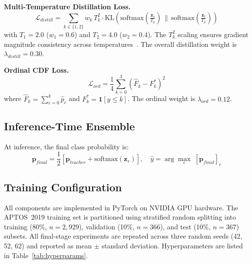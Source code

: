 \documentclass[10pt, twocolumn]{article}
\begin{document}
\textbf{Multi-Temperature Distillation Loss.}
\begin{equation}
  \mathcal{L}_{distill} = \sum_{k \in \{1,2\}} w_k\, T_k^2 \cdot
  \text{KL}\!\left(\text{softmax}\!\left(\tfrac{\mathbf{z}_s}{T_k}\right) \,\Big\|\,
  \text{softmax}\!\left(\tfrac{\mathbf{z}_t}{T_k}\right)\right)
\end{equation}
with $T_1{=}2.0$ ($w_1{=}0.6$) and $T_2{=}4.0$ ($w_2{=}0.4$). The $T_k^2$
scaling ensures gradient magnitude consistency across temperatures~\cite{hinton2015}.
The overall distillation weight is $\lambda_{distill} = 0.30$.

\textbf{Ordinal CDF Loss.}
\begin{equation}
  \mathcal{L}_{ord} = \frac{1}{4}\sum_{k=0}^{3} \left(\hat{F}_k - F_k^*\right)^2
\end{equation}
where $\hat{F}_k = \sum_{c=0}^{k} \hat{p}_c$ and $F_k^* = \mathbf{1}[y \leq k]$.
The ordinal weight is $\lambda_{ord} = 0.12$.

\subsection{Inference-Time Ensemble}

At inference, the final class probability is:
\begin{equation}
  \mathbf{p}_{final} = \frac{1}{2}\!\left[\mathbf{p}_{teacher} +
  \text{softmax}(\mathbf{z}_s)\right], \quad
  \hat{y} = \arg\max_c\; [\mathbf{p}_{final}]_c
\end{equation}

\subsection{Training Configuration}

All components are implemented in PyTorch on NVIDIA GPU hardware. The APTOS~2019
training set is partitioned using stratified random splitting into training (80\%,
$n{=}2{,}929$), validation (10\%, $n{=}366$), and test (10\%, $n{=}367$) subsets.
All final-stage experiments are repeated across three random seeds (42, 52, 62) and
reported as mean $\pm$ standard deviation. Hyperparameters are listed in
Table~\ref{tab:hyperparams}.
\end{document}
